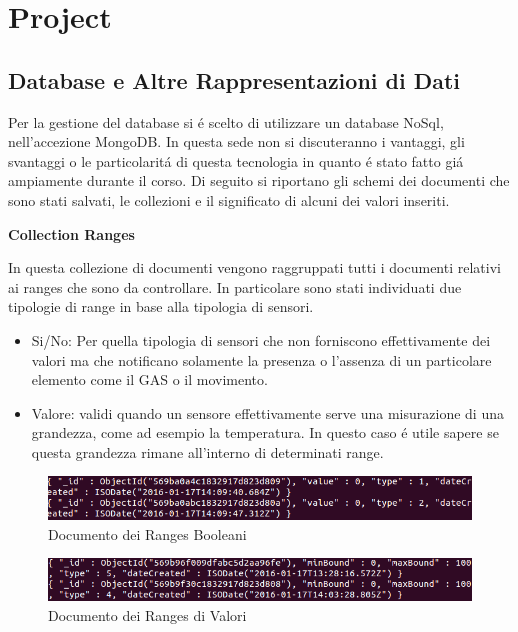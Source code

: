 \section{Project}
\subsection{Database e Altre Rappresentazioni di Dati}
Per la gestione del database si \'e scelto di utilizzare un database NoSql, nell'accezione MongoDB\cite{MongoDB}. In questa sede non si discuteranno i vantaggi, gli svantaggi o le particolarit\'a di questa tecnologia in quanto \'e stato fatto gi\'a ampiamente durante il corso. Di seguito si riportano gli schemi dei documenti che sono stati salvati, le collezioni e il significato di alcuni dei valori inseriti.

\begin{center}
\textbf{Collection Ranges}
\end{center}

In questa collezione di documenti vengono raggruppati tutti i documenti relativi ai ranges che sono da controllare. In particolare sono stati individuati due tipologie di range in base alla tipologia di sensori.

\begin{itemize}
  \item Si/No: Per quella tipologia di sensori che non forniscono effettivamente dei valori ma che notificano solamente la presenza o l'assenza di un particolare elemento come il GAS o il movimento.
  \item  Valore: validi quando un sensore effettivamente serve una misurazione di una grandezza, come ad esempio la temperatura. In questo caso \'e utile sapere se questa grandezza rimane all'interno di determinati range.
\end{itemize}
 
\begin{figure}[ht]
\centering
\includegraphics[width=\textwidth,natwidth=610,natheight=642]{Figures/DataStructures/RangesBoolean.png}
\caption{Documento dei Ranges Booleani}
\end{figure}


\begin{figure}[ht]
\centering
\includegraphics[width=\textwidth,natwidth=610,natheight=642]{Figures/DataStructures/RangesValues.png}
\caption{Documento dei Ranges di Valori}
\end{figure}

